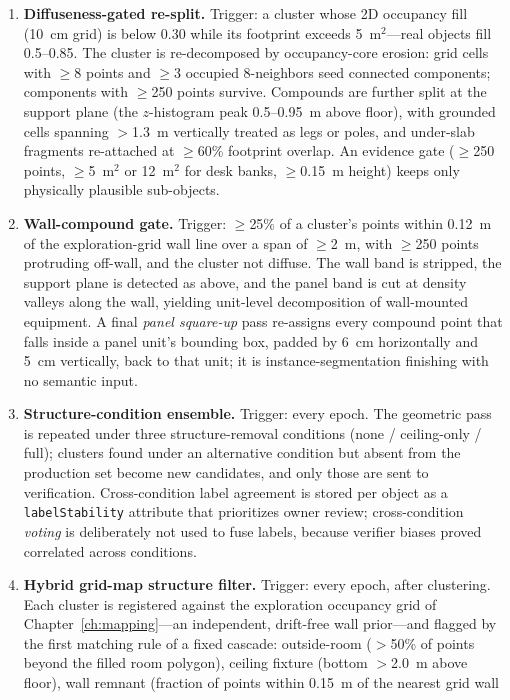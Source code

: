 \begin{enumerate}
\item \textbf{Diffuseness-gated re-split.} Trigger: a cluster whose 2D
occupancy fill (10~cm grid) is below 0.30 while its footprint exceeds
5~m$^2$---real objects fill 0.5--0.85. The cluster is re-decomposed by
occupancy-core erosion: grid cells with $\ge$8 points and $\ge$3 occupied
8-neighbors seed connected components; components with $\ge$250 points survive.
Compounds are further split at the support plane (the $z$-histogram peak
0.5--0.95~m above floor), with grounded cells spanning $>$1.3~m vertically
treated as legs or poles, and under-slab fragments re-attached at $\ge$60\%
footprint overlap. An evidence gate ($\ge$250 points, $\ge$5~m$^2$ or 12~m$^2$
for desk banks, $\ge$0.15~m height) keeps only physically plausible
sub-objects.
\item \textbf{Wall-compound gate.} Trigger: $\ge$25\% of a cluster's points
within 0.12~m of the exploration-grid wall line over a span of $\ge$2~m, with
$\ge$250 points protruding off-wall, and the cluster not diffuse. The wall
band is stripped, the support plane is detected as above, and the panel band
is cut at density valleys along the wall, yielding unit-level decomposition of
wall-mounted equipment. A final \emph{panel square-up} pass re-assigns every
compound point that falls inside a panel unit's bounding box, padded by 6~cm
horizontally and 5~cm vertically, back to that unit; it is
instance-segmentation finishing with no semantic input.
\item \textbf{Structure-condition ensemble.} Trigger: every epoch. The
geometric pass is repeated under three structure-removal conditions (none /
ceiling-only / full); clusters found under an alternative condition but absent
from the production set become new candidates, and only those are sent to
verification. Cross-condition label agreement is stored per object as a
\texttt{labelStability} attribute that prioritizes owner review;
cross-condition \emph{voting} is deliberately not used to fuse labels, because
verifier biases proved correlated across conditions.
\item \textbf{Hybrid grid-map structure filter.} Trigger: every epoch, after
clustering. Each cluster is registered against the exploration occupancy grid
of Chapter~\ref{ch:mapping}---an independent, drift-free wall prior---and
flagged by the first matching rule of a fixed cascade: outside-room ($>$50\% of
points beyond the filled room polygon), ceiling fixture (bottom $>$2.0~m above
floor), wall remnant (fraction of points within 0.15~m of the nearest grid wall

\end{enumerate}
